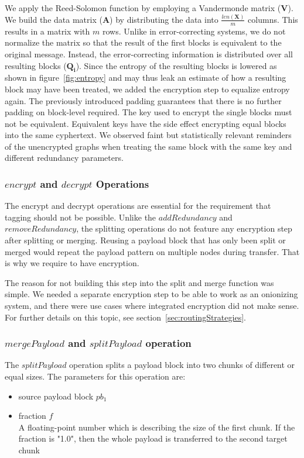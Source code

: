 We apply the Reed-Solomon function by employing a Vandermonde matrix ($\mathbf{V}$). We build the data matrix ($\mathbf{A}$) by distributing the data into $\frac{len\left(\mathbf{X}\right)}{m}$ columns. This results in a matrix with $m$ rows. Unlike in error-correcting systems, we do not normalize the matrix so that the result of the first blocks is equivalent to the original message. Instead, the error-correcting information is distributed over all resulting blocks ($\mathbf{Q_i}$). Since the entropy of the resulting blocks is lowered as shown in figure~\ref{fig:entropy} and may thus leak an estimate of how a resulting block may have been treated, we added the encryption step to equalize entropy again. The previously introduced padding guarantees that there is no further padding on block-level required. The key used to encrypt the single blocks must not be equivalent. Equivalent keys have the side effect encrypting equal blocks into the same cyphertext. We observed faint but statistically relevant reminders of the unencrypted graphs when treating the same block with the same key and different redundancy parameters.

\subsubsection{$encrypt$ and $decrypt$ Operations}
The encrypt and decrypt operations are essential for the requirement that tagging should not be possible. Unlike the $addRedundancy$ and $removeRedundancy$, the splitting operations do not feature any encryption step after splitting or merging. Reusing a payload block that has only been split or merged would repeat the payload pattern on multiple nodes during transfer. That is why we require to have encryption.

The reason for not building this step into the split and merge function was simple. We needed a separate encryption step to be able to work as an onionizing system, and there were use cases where integrated encryption did not make sense. For further details on this topic, see section~\ref{sec:routingStrategies}.


\subsubsection{$mergePayload$ and $splitPayload$ operation}
The $splitPayload$ operation splits a payload block into two chunks of different or equal sizes. The parameters for this operation are:

\begin{itemize}
	\item source payload block $pb_1$
	\item fraction $f$\\
	A floating-point number which is describing the size of the first chunk. If the fraction is "1.0", then the whole payload is transferred to the second target chunk
\end{itemize}

